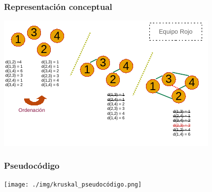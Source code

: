 \documentclass[13pt]{beamer}
\begin{document}
    \begin{frame}
		\frametitle{Representación conceptual}
		\begin{center}
			\includegraphics[scale=1.5]{./img/DibPropio.pdf}
		\end{center}
	\end{frame}

	\begin{frame}
		\frametitle{Pseudocódigo}
		\begin{center}
			\texttt{[image: ./img/kruskal\_pseudocódigo.png]}
		\end{center}
	\end{frame}
\end{document}
